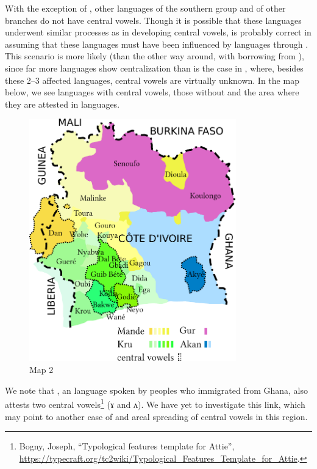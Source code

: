 \documentclass[output=paper,newtxmath,modfonts,nonflat]{langsci/langscibook}
\begin{document}
With the exception of , other languages of the southern  group and of other  branches do not have central vowels.  Though it is possible that these languages underwent similar processes as  in developing central vowels, \citet{Vydrine2009} is probably correct in assuming that these languages must have been influenced by  languages through . This scenario is more likely (than the other way around, with  borrowing from ), since far more  languages show centralization than is the case in , where, besides these 2–3 affected languages, central vowels are virtually unknown.  In the map below, we see  languages with central vowels, those without and the area where they are attested in  languages. 

\begin{figure}
\includegraphics[width=0.8\textwidth]{figures/zogbo2.pdf}
\caption{Map 2}
\end{figure}  

We note that , an  language spoken by peoples who immigrated from Ghana, also attests two central vowels\footnote{Bogny, Joseph, “Typological features template for Attie”, \url{https://typecraft.org/tc2wiki/Typological_Features_Template_for_Attie}.} (ɤ and ʌ).  We have yet to investigate this link, which may point to another case of  and areal spreading of central vowels in this region.
\end{document}
